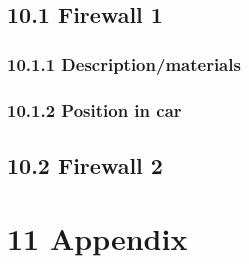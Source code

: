 \documentclass{article}
\begin{document}
\subsection*{10.1 Firewall 1}

\subsubsection*{10.1.1 Description/materials}

\subsubsection*{10.1.2 Position in car}

\subsection*{10.2 Firewall 2}

\section*{11 Appendix}
\end{document}

